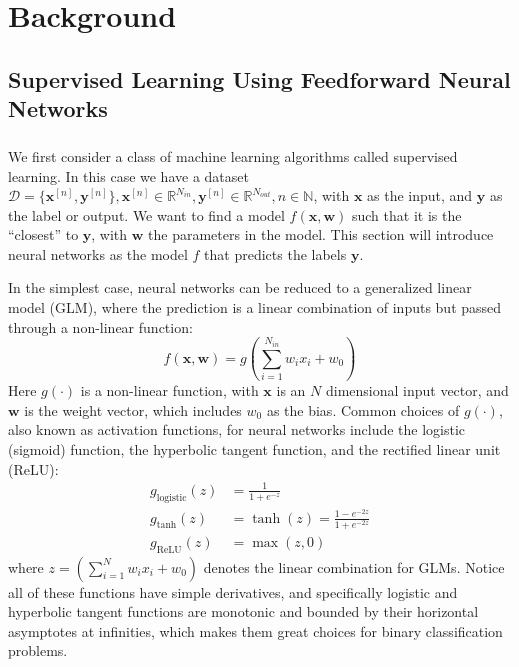 
\chapter{Background} \label{ch:background}

\section{Supervised Learning Using Feedforward Neural Networks} \label{sc:nnet}

\paragraph{}
We first consider a class of machine learning algorithms
called supervised learning. 
In this case we have a dataset $\mathcal{D} = \{\mathbf{x}^{[n]}, 
\mathbf{y}^{[n]}\}, \mathbf{x}^{[n]} \in \mathbb{R}^{N_{in}}, 
\mathbf{y}^{[n]} \in \mathbb{R}^{N_{out}}, n \in \mathbb{N}$,
with $\mathbf{x}$ as the input, and $\mathbf{y}$ as the label or output.
We want to find a model 
$f(\mathbf{x},\mathbf{w})$ such that 
it is the ``closest'' to $\mathbf{y}$, 
with $\mathbf{w}$ the parameters in the model.
This section will introduce neural networks as the model $f$
that predicts the labels $\mathbf{y}$.

In the simplest case, neural networks can be reduced to 
a generalized linear model (GLM),
where the prediction is a linear combination of inputs
but passed through a non-linear function:
%
\begin{equation}
	f(\mathbf{x},\mathbf{w}) = g\left( \sum_{i=1}^{N_{in}} w_i x_i + w_0 \right)
\end{equation}
%
\indent Here $g(\cdot)$ is a non-linear function, 
with $\mathbf{x}$ is an $N$ dimensional input vector,
and $\mathbf{w}$ is the weight vector,
which includes $w_0$ as the bias.
Common choices of $g(\cdot)$, also known as activation functions,
for neural networks 
include the logistic (sigmoid) function, the hyperbolic tangent function, 
and the rectified linear unit (ReLU):
%
\begin{equation}
\begin{aligned}
	g_{\text{logistic}}(z) &= \frac{1}{1+e^{-z}} \\
	g_{\text{tanh}}(z) &= \tanh(z) = \frac{1 - e^{-2z}}{1 + e^{-2z}}\\
	g_\text{ReLU}(z) &= \max(z,0)
\end{aligned}
\end{equation}
%
where $z = \left( \sum_{i=1}^N w_i x_i + w_0 \right)$ 
denotes the linear combination for GLMs.
Notice all of these functions have simple derivatives,
and specifically logistic and hyperbolic tangent functions 
are monotonic and bounded by their horizontal asymptotes at infinities,
which makes them great choices for binary classification problems.

